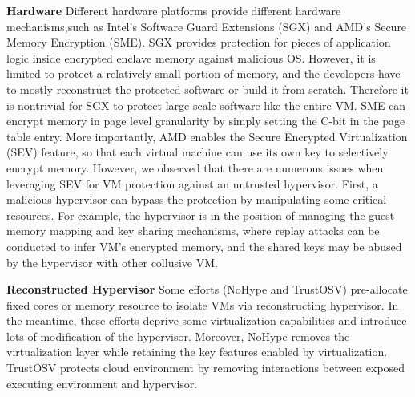 \documentclass[conference]{IEEEtran}
\begin{document}
\textbf{Hardware}
Different hardware platforms provide different hardware mechanisms,such as Intel's Software Guard Extensions (SGX) and AMD's Secure Memory Encryption (SME)\cite{WuLLCZG18}.
SGX provides protection for pieces of application logic inside encrypted enclave memory against malicious OS. However, it is limited to protect a relatively small portion
of memory, and the developers have to mostly reconstruct the protected software or build it from scratch. Therefore it is nontrivial for SGX to protect large-scale software like the entire VM. 
SME can encrypt memory in page level granularity by simply setting the C-bit
in the page table entry. More importantly, AMD enables the Secure Encrypted Virtualization (SEV) feature, so that each virtual machine can use its own key to selectively encrypt memory.
However, we observed that there are numerous issues when leveraging SEV for VM protection against an untrusted hypervisor. First, a malicious hypervisor can bypass the protection by manipulating some critical resources. For example, the hypervisor is in the position of managing the guest memory mapping and key sharing mechanisms, where replay attacks can be conducted to infer VM's encrypted memory, and the shared keys may be abused by the hypervisor with other collusive VM.



\textbf{Reconstructed Hypervisor }
Some efforts (NoHype\cite{NoHype} and TrustOSV\cite{TrustOSV}) pre-allocate fixed cores or memory resource to isolate VMs via reconstructing hypervisor. In the meantime, these efforts deprive some virtualization capabilities and introduce lots of modification of the hypervisor. Moreover, NoHype removes the virtualization layer while retaining the key features enabled by virtualization. TrustOSV protects cloud environment by removing interactions between exposed executing environment and hypervisor.
\end{document}

